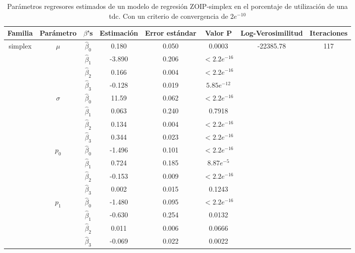 \begin{table}[!hbt]
{\scriptsize
\begin{center}
\begin{tabular}{|c|c|c|ccc|c|c|}\hline
Familia & Par\'{a}metro & $\beta$'s & Estimaci\'{o}n & Error est\'{a}ndar & Valor P & Log-Verosimilitud & Iteraciones \\ \hline \hline
\multirow{12}{*}{simplex} & \multirow{4}{*}{$\mu$} & $\hat{\beta}_0$ & 0.180	&0.050	&0.0003  & \multirow{12}{*}{-22385.78} & \multirow{12}{*}{117} \\
& & $\hat{\beta}_1$ & -3.890	&0.206	&$<2.2e^{-16}$   & &\\
& & $\hat{\beta}_2$ & 0.166	&0.004	&$<2.2e^{-16}$   & &\\
& & $\hat{\beta}_3$ & -0.128	&0.019	&$5.85e^{-12}$   & &\\ \cline{2-6}
& \multirow{4}{*}{$\sigma$} & $\hat{\beta}_0$ & 11.59	&0.062	&$<2.2e^{-16}$   & &\\
& & $\hat{\beta}_1$ & 0.063	&0.240	&0.7918   & &\\
& & $\hat{\beta}_2$ & 0.134	&0.004	&$<2.2e^{-16}$  & &\\
& & $\hat{\beta}_3$ & 0.344	&0.023	&$<2.2e^{-16}$   & &\\ \cline{2-6}
& \multirow{4}{*}{$p_0$} & $\hat{\beta}_0$ & -1.496	&0.101	&$<2.2e^{-16}$  & &\\
& & $\hat{\beta}_1$ & 0.724	&0.185	&$8.87e^{-5}$  & &\\
& & $\hat{\beta}_2$ & -0.153	&0.009	&$<2.2e^{-16}$  & &\\
& & $\hat{\beta}_3$ & 0.002	&0.015	&0.1243  & &\\ \cline{2-6}
& \multirow{4}{*}{$p_1$} & $\hat{\beta}_0$ &-1.480	&0.095	&$<2.2e^{-16}$  & &\\
& & $\hat{\beta}_1$ & -0.630	&0.254	&0.0132  & &\\
& & $\hat{\beta}_2$ & 0.011	&0.006	&0.0666  & &\\
& & $\hat{\beta}_3$ & -0.069	&0.022	&0.0022  & &\\ \hline

\end{tabular}
\caption{Par\'{a}metros regresores estimados de un modelo de regresi\'{o}n ZOIP-simplex en el porcentaje de utilizaci\'{o}n de una tdc. Con un criterio de convergencia de $2e^{-10}$}
\label{T_Apli_CC_Sim}
\end{center}
}
\end{table}

